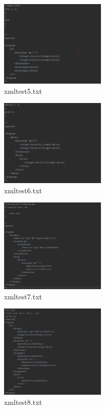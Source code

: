 \documentclass{article}
\begin{document}
\begin{multicols}{2}
					\begin{figure}[H]
					\centering
			 			\includegraphics[width=0.45\textwidth]{xmltest5.png}
			 			\centering
			  			\caption{xmltest5.txt}
			  			\label{fig:xmltest5}
					\end{figure}
					\begin{figure}[H]
					\centering
			 			\includegraphics[width=0.45\textwidth]{xmltest6.png}
			 			\centering
			  			\caption{xmltest6.txt}
			  			\label{fig:xmltest6}
					\end{figure}
					
					\begin{figure}[H]
					\centering
			 			\includegraphics[width=0.45\textwidth]{xmltest7.png}
			 			\centering
			  			\caption{xmltest7.txt}
			  			\label{fig:xmltest7}
					\end{figure}
					

					
					\begin{figure}[H]
					\centering
			 			\includegraphics[width=0.45\textwidth]{xmltest8.png}
			 			\centering
			  			\caption{xmltest8.txt}
			  			\label{fig:xmltest8}
					\end{figure}


\end{multicols}
\end{document}
